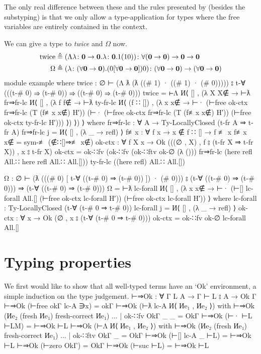 \documentclass[logo,bsc,singlespacing,parskip,online]{infthesis}
\renewenvironment{code}{\mintedcopy[breaklines,breaksymbolleft=\;]{agda}}{\endmintedcopy}
\begin{document}
The only real difference between these and the rules presented by \citet{chargueraud_locally_2012}
(besides the substyping) is that we only allow a type-application for types where the free variables
are entirely contained in the context.

We can give a type to \textit{twice} and $\Omega$ now.
\begin{align}
\label{equation:twice_big_omega}
  \text{twice} &\triangleq (\Lambda \lambda \colon \mathbf{0} \to \mathbf{0}. \lambda \colon \mathbf{0}. 1(10))
    \colon \forall (\mathbf{0} \to \mathbf{0}) \to \mathbf{0} \to \mathbf{0}\\
  \Omega &\triangleq (\lambda \colon (\forall \mathbf{0} \to \mathbf{0}). (0 [\forall \mathbf{0} \to \mathbf{0}]) 0)
    \colon (\forall \mathbf{0} \to \mathbf{0}) \to (\forall \mathbf{0} \to \mathbf{0}) \notag
\end{align}
\begin{code}
  module example where
    twice : ∅ ⊢ (Λ ƛ (ƛ ((# 1) · ((# 1) · (# 0)))))
        ⦂ t-∀ (((t-# 0) ⇒ (t-# 0))
          ⇒ ((t-# 0) ⇒ (t-# 0)))
    twice = ⊢Λ И⟨ [] , (λ X {X∉} → ⊢ƛ fr⇒fr-lc И⟨ [] , (λ f {f∉} →
      ⊢ƛ ty-fr-lc И⟨ (f ∷ []) , (λ x {x∉} → ⊢·
        (⊢free ok-ctx fr⇒fr-lc (T (f≢x x∉) H′))
        (⊢· (⊢free ok-ctx fr⇒fr-lc (T (f≢x x∉) H′)) (⊢free ok-ctx ty-fr-lc H′))) ⟩) ⟩) ⟩
      where
        fr⇒fr-lc : ∀ {A} → Ty-LocallyClosed (t-fr A ⇒ t-fr A)
        fr⇒fr-lc j = И⟨ [] , (λ _ → refl) ⟩
        f≢x : ∀ {f x} → x ∉ f ∷ [] → f ≢ x
        f≢x x∉ = sym-≢ (∉∷[]⇒≢ x∉)
        ok-ctx : ∀ {f X x} → Ok (((∅ , X) , f ⦂ (t-fr X ⇒ t-fr X)) , x ⦂ t-fr X)
        ok-ctx = ok-∷fv
                   (ok-∷fv (ok-∷ftv ok-∅ (λ ()))
                     fr⇒fr-lc
                     (here refl All.∷ here refl All.∷ All.[]))
                   ty-fr-lc
                   ((here refl) All.∷ All.[])

    Ω : ∅ ⊢ (ƛ (((# 0) [ t-∀ ((t-# 0) ⇒ (t-# 0)) ]) · (# 0)))
        ⦂ (t-∀ ((t-# 0) ⇒ (t-# 0))) ⇒ (t-∀ ((t-# 0) ⇒ (t-# 0)))
    Ω = ⊢ƛ lc-forall И⟨ [] , (λ x {x∉} →
      ⊢·
        (⊢[] lc-forall All.[] (⊢free ok-ctx lc-forall H′))
        (⊢free ok-ctx lc-forall H′)) ⟩
      where
        lc-forall : Ty-LocallyClosed (t-∀ (t-# 0 ⇒ t-# 0))
        lc-forall j = И⟨ [] , (λ _ → refl) ⟩
        ok-ctx : ∀ {x} →  Ok (∅ , x ⦂ (t-∀ (t-# 0 ⇒ t-# 0)))
        ok-ctx = ok-∷fv ok-∅ lc-forall All.[]
\end{code}

\section{Typing properties}
We first would like to show that all well-typed terms have an `Ok' environment, a simple induction
on the type judgement.
\begin{code}
  ⊢⇒Ok : ∀ {Γ L A} → Γ ⊢ L ⦂ A → Ok Γ
  ⊢⇒Ok (⊢free okΓ lc-A ∋x) = okΓ
  ⊢⇒Ok (⊢ƛ lc-A И⟨ Иe₁ , Иe₂ ⟩) with ⊢⇒Ok (Иe₂ (fresh Иe₁) {fresh-correct Иe₁})
  ... | ok-∷fv OkΓ _ _ = OkΓ
  ⊢⇒Ok (⊢· ⊢L ⊢LM) = ⊢⇒Ok ⊢L
  ⊢⇒Ok (⊢Λ И⟨ Иe₁ , Иe₂ ⟩) with ⊢⇒Ok (Иe₂ (fresh Иe₁) {fresh-correct Иe₁})
  ... | ok-∷ftv OkΓ _ = OkΓ
  ⊢⇒Ok (⊢[] lc-A _ ⊢L) = ⊢⇒Ok ⊢L
  ⊢⇒Ok (⊢zero OkΓ) = OkΓ
  ⊢⇒Ok (⊢suc ⊢L) = ⊢⇒Ok ⊢L
\end{code}
\end{document}
